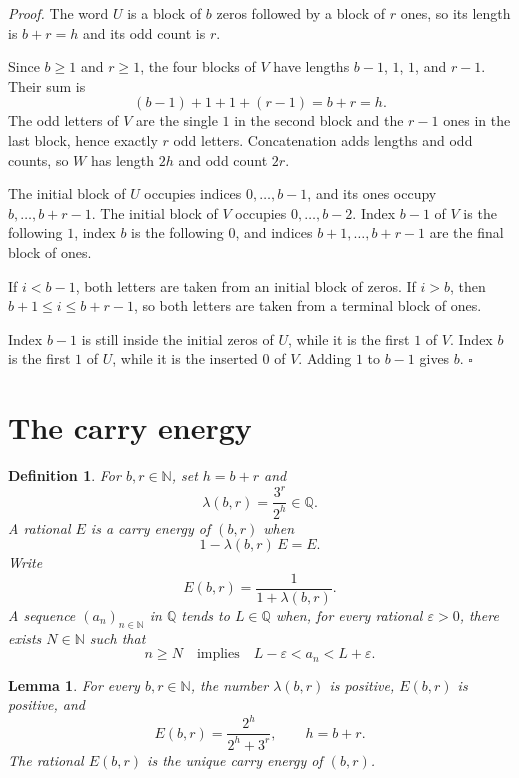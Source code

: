 \documentclass[11pt,letterpaper]{article}
\newcommand{\N}{\mathbb{N}}
\newcommand{\Q}{\mathbb{Q}}
\newtheorem{lemma}[theorem]{Lemma}
\newtheorem{definition}[theorem]{Definition}
\newenvironment{proof}{\noindent\textit{Proof.}}{\hfill\(\square\)}
\begin{document}
\begin{proof}
The word \(U\) is a block of \(b\) zeros followed by a block of \(r\) ones, so its length is \(b+r=h\) and its odd count is \(r\).

Since \(b\geq 1\) and \(r\geq 1\), the four blocks of \(V\) have lengths \(b-1\), \(1\), \(1\), and \(r-1\). Their sum is
\[
(b-1)+1+1+(r-1)=b+r=h.
\]
The odd letters of \(V\) are the single \(1\) in the second block and the \(r-1\) ones in the last block, hence exactly \(r\) odd letters. Concatenation adds lengths and odd counts, so \(W\) has length \(2h\) and odd count \(2r\).

The initial block of \(U\) occupies indices \(0,\ldots,b-1\), and its ones occupy \(b,\ldots,b+r-1\). The initial block of \(V\) occupies \(0,\ldots,b-2\). Index \(b-1\) of \(V\) is the following \(1\), index \(b\) is the following \(0\), and indices \(b+1,\ldots,b+r-1\) are the final block of ones.

If \(i<b-1\), both letters are taken from an initial block of zeros. If \(i>b\), then \(b+1\leq i\leq b+r-1\), so both letters are taken from a terminal block of ones.

Index \(b-1\) is still inside the initial zeros of \(U\), while it is the first \(1\) of \(V\). Index \(b\) is the first \(1\) of \(U\), while it is the inserted \(0\) of \(V\). Adding \(1\) to \(b-1\) gives \(b\).
\end{proof}

\section{The carry energy}

\begin{definition}
\label{def:energy}
For \(b,r\in\N\), set \(h=b+r\) and
\[
\lambda(b,r)=\frac{3^{r}}{2^{h}}\in\Q.
\]
A rational \(E\) is a carry energy of \((b,r)\) when
\[
1-\lambda(b,r)\,E=E.
\]
Write
\[
E(b,r)=\frac{1}{1+\lambda(b,r)}.
\]
A sequence \((a_{n})_{n\in\N}\) in \(\Q\) tends to \(L\in\Q\) when, for every rational \(\varepsilon>0\), there exists \(N\in\N\) such that
\[
n\geq N\quad\text{implies}\quad L-\varepsilon<a_{n}<L+\varepsilon.
\]
\end{definition}

\begin{lemma}
\label{lem:closed}
For every \(b,r\in\N\), the number \(\lambda(b,r)\) is positive, \(E(b,r)\) is positive, and
\[
E(b,r)=\frac{2^{h}}{2^{h}+3^{r}},\qquad h=b+r.
\]
The rational \(E(b,r)\) is the unique carry energy of \((b,r)\).
\end{lemma}
\end{document}
